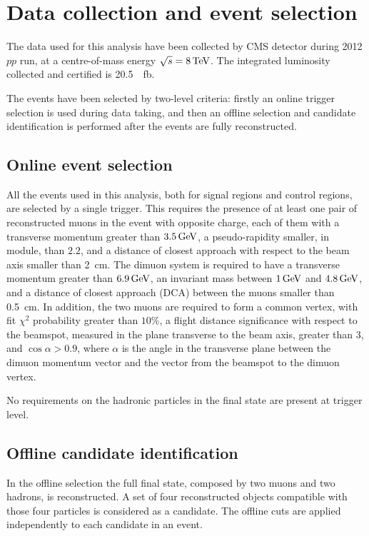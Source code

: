 \chapter{Data collection and event selection}\label{sec:selection}

The data used for this analysis have been collected by CMS detector during 2012 $pp$ run, at a centre-of-mass energy $\sqrt{s}=8\,\textrm{TeV}$.
The integrated luminosity collected and certified is \SI{20.5}{\per\femto\barn}.

The events have been selected by two-level criteria: firstly an online trigger selection is used during data taking, and then an offline selection and candidate identification is performed after the events are fully reconstructed.

\section{Online event selection}
\label{sec:onsel}
All the events used in this analysis, both for signal regions and control regions, are selected by a single trigger. This requires the presence of at least one pair of reconstructed muons in the event with opposite charge, each of them with a transverse momentum greater than $3.5\,\textrm{GeV}$, a pseudo-rapidity smaller, in module, than $2.2$, and a distance of closest approach with respect to the beam axis smaller than \SI{2}{\centi\metre}. The dimuon system is required to have a transverse momentum greater than $6.9\,\textrm{GeV}$, an invariant mass between $1\,\textrm{GeV}$ and $4.8\,\textrm{GeV}$, and a distance of closest approach (DCA) between the muons smaller than \SI{0.5}{\centi\metre}. In addition, the two muons are required to form a common vertex, with fit $\chi^2$ probability greater than $10\%$, a flight distance significance with respect to the beamspot, measured in the plane transverse to the beam axis, greater than 3, and $\cos{\alpha}>0.9$, where $\alpha$ is the angle in the transverse plane between the dimuon momentum vector and the vector from the beamspot to the dimuon vertex.

No requirements on the hadronic particles in the final state are present at trigger level.

\section{Offline candidate identification}
\label{sec:offsel}

In the offline selection the full final state, composed by two muons and two hadrons, is reconstructed. A set of four reconstructed objects compatible with those four particles is considered as a candidate. The offline cuts are applied independently to each candidate in an event.

